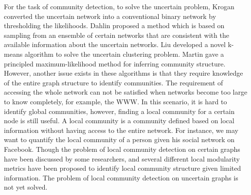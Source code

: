 \documentclass[\main/thesis.tex]{subfiles}
\begin{document}
For the task of community detection, to solve the uncertain problem, Krogan \cite{krogan2006global} converted the uncertain network into a conventional binary network by thresholding the likelihoods. Dahlin \cite{dahlin2011method} proposed a method which is based on sampling from an ensemble of certain networks that are consistent with the available information about the uncertain networks. Liu \cite{liureliable} developed a novel k-means algorithm to solve the uncertain clustering problem. Martin \cite{martin2016structural} gave a principled maximum-likelihood method for inferring community structure. However, another issue exists in these algorithms is that they require knowledge of the entire graph structure to identify communities. The requirement of accessing the whole network can not be satisfied when networks become too large to know completely, for example, the WWW. In this scenario, it is hard to identify global communities, however, finding a local community for a certain node is still useful. A local community is a community defined based on local information without having access to the entire network. For instance, we may want to quantify the local community of a person given his social network on Facebook. Though the problem of local community detection on certain graphs have been discussed by some researchers, and several different local modularity metrics \cite{clauset2005finding,chen2009detecting,chen2009local} have been proposed to identify local community structure given limited information. The problem of local community detection on uncertain graphs is not yet solved.
\end{document}
